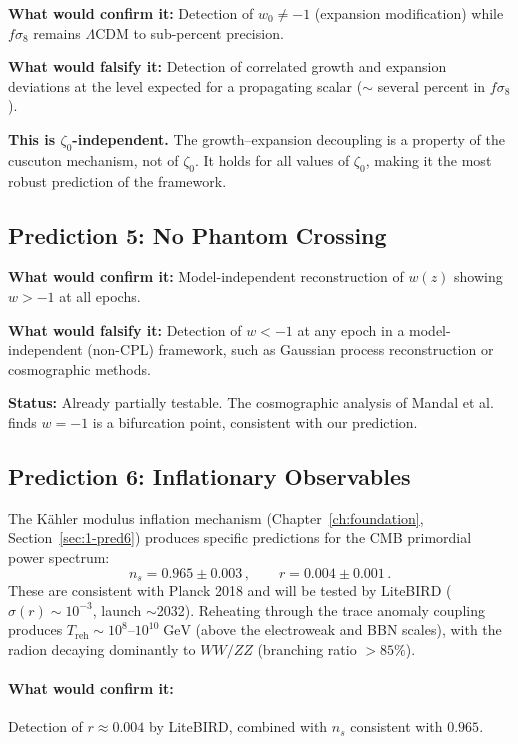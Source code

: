 \textbf{What would confirm it:} Detection of $w_0 \neq -1$ (expansion modification) while $f\sigma_8$ remains $\Lambda$CDM to sub-percent precision.

\textbf{What would falsify it:} Detection of correlated growth and expansion deviations at the level expected for a propagating scalar ($\sim$ several percent in $f\sigma_8$).

\textbf{This is $\zeta_0$-independent.} The growth--expansion decoupling is a property of the cuscuton mechanism, not of $\zeta_0$. It holds for all values of $\zeta_0$, making it the most robust prediction of the framework.

\subsection{Prediction 5: No Phantom Crossing}
\label{sec:2-pred5}

\textbf{What would confirm it:} Model-independent reconstruction of $w(z)$ showing $w > -1$ at all epochs.

\textbf{What would falsify it:} Detection of $w < -1$ at any epoch in a model-independent (non-CPL) framework, such as Gaussian process reconstruction or cosmographic methods.

\textbf{Status:} Already partially testable. The cosmographic analysis of Mandal et al.~\cite{ch2:Mandal2025} finds $w = -1$ is a bifurcation point, consistent with our prediction.

\subsection{Prediction 6: Inflationary Observables}
\label{sec:2-pred6}

The K\"ahler modulus inflation mechanism (Chapter~\ref{ch:foundation}, Section~\ref{sec:1-pred6}) produces specific predictions for the CMB primordial power spectrum:
\begin{equation}
n_s = 0.965 \pm 0.003\,,\qquad r = 0.004 \pm 0.001\,.
\end{equation}
These are consistent with Planck 2018 and will be tested by LiteBIRD ($\sigma(r) \sim 10^{-3}$, launch $\sim$2032). Reheating through the trace anomaly coupling produces $T_\mathrm{reh} \sim 10^{8}$--$10^{10}\;\mathrm{GeV}$ (above the electroweak and BBN scales), with the radion decaying dominantly to $WW/ZZ$ (branching ratio $> 85\%$).

\paragraph{What would confirm it:} Detection of $r \approx 0.004$ by LiteBIRD, combined with $n_s$ consistent with $0.965$.

